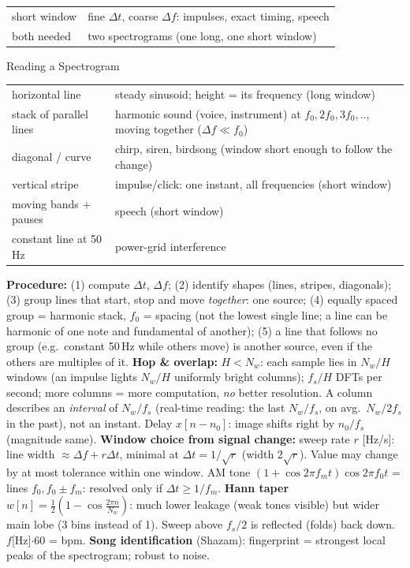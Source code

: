 \documentclass[a4paper,landscape]{article}
\newcommand{\sub}[1]{\par\vspace{0.6pt}\noindent\colorbox{subblue}{\parbox{\dimexpr\linewidth-2\fboxsep}{\bfseries\strut #1}}\par\vspace{0.2pt}}
\begin{document}
\begin{multicols*}{4}
\begin{tabularx}{\linewidth}{@{}lY@{}}
short window & fine $\Delta t$, coarse $\Delta f$: impulses, exact timing, speech\\
both needed & two spectrograms (one long, one short window)
\end{tabularx}
\sub{Reading a Spectrogram}
\begin{tabularx}{\linewidth}{@{}lY@{}}
horizontal line & steady sinusoid; height = its frequency (long window)\\
stack of parallel lines & harmonic sound (voice, instrument) at $f_0,2f_0,3f_0,..$, moving together ($\Delta f\ll f_0$)\\
diagonal / curve & chirp, siren, birdsong (window short enough to follow the change)\\
vertical stripe & impulse/click: one instant, all frequencies (short window)\\
moving bands + pauses & speech (short window)\\
constant line at 50\,Hz & power-grid interference
\end{tabularx}
\textbf{Procedure:} (1) compute $\Delta t$, $\Delta f$; (2) identify shapes (lines, stripes, diagonals); (3) group lines that start, stop and move \emph{together}: one source; (4) equally spaced group = harmonic stack, $f_0$ = spacing (not the lowest single line; a line can be harmonic of one note and fundamental of another); (5) a line that follows no group (e.g.\ constant 50\,Hz while others move) is another source, even if the others are multiples of it.
\textbf{Hop \& overlap:} $H<N_w$: each sample lies in $N_w/H$ windows (an impulse lights $N_w/H$ uniformly bright columns); $f_s/H$ DFTs per second; more columns = more computation, \emph{no} better resolution. A column describes an \emph{interval} of $N_w/f_s$ (real-time reading: the last $N_w/f_s$, on avg.\ $N_w/2f_s$ in the past), not an instant. Delay $x[n{-}n_0]$: image shifts right by $n_0/f_s$ (magnitude same).
\textbf{Window choice from signal change:} sweep rate $r$ [Hz/s]: line width $\approx\Delta f+r\Delta t$, minimal at $\Delta t=1/\sqrt r$ (width $2\sqrt r$). Value may change by at most tolerance within one window. AM tone $(1{+}\cos2\pi f_mt)\cos2\pi f_0t$ = lines $f_0,f_0\pm f_m$: resolved only if $\Delta t\ge1/f_m$.
\textbf{Hann taper} $w[n]=\frac12(1-\cos\frac{2\pi n}{N_w})$: much lower leakage (weak tones visible) but wider main lobe (3 bins instead of 1). Sweep above $f_s/2$ is reflected (folds) back down. $f$[Hz]$\cdot60$ = bpm.
\textbf{Song identification} (Shazam): fingerprint = strongest local peaks of the spectrogram; robust to noise.


\end{multicols*}
\end{document}
